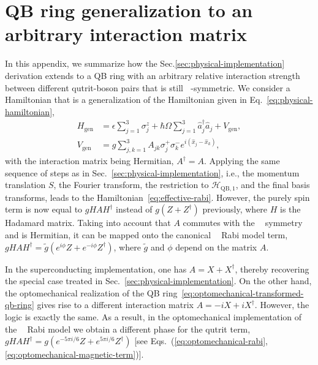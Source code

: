 \documentclass[reprint, aps, prx, amsmath, amssymb, longbibliography, superscriptaddress]{revtex4-2}
\DeclareMathOperator{\Zthree}{\mathbb{Z}_3}
\begin{document}
\appendix

\section{QB ring generalization to an arbitrary interaction matrix}
\label{app:arbitrary-interaction-summary}

In this appendix, we summarize how the Sec.\ref{sec:physical-implementation} derivation extends to a QB ring
with an arbitrary relative interaction strength between different qutrit-boson pairs that is still $\Zthree$-symmetric. We consider a Hamiltonian that is a generalization of the Hamiltonian given in Eq.~\eqref{eq:physical-hamiltonian},
\begin{equation}
\label{eq:arbitary-interaction-hamiltonian}
  \begin{aligned}
    H_{\text{gen}} &= \epsilon \sum_{j=1}^{3} \sigma_j^z
      + \hbar \Omega \sum_{j=1}^{3} \hat a_j^{\dagger} \hat a_j + V_{\text{gen}},
      \\
    V_{\text{gen}} &= g \sum_{j,k=1}^3 A_{jk}
      \sigma_j^{+} \sigma_k^{-} e^{ i ( \hat x_j - \hat x_k ) },
  \end{aligned}
\end{equation}
with the interaction matrix being Hermitian, $A^{\dagger}=A$. Applying the same sequence of steps as in Sec.~\ref{sec:physical-implementation}, i.e., the momentum translation $S$,
the Fourier transform, the restriction to $\mathcal H_{\text{QB},1}$, and the final basis transforms, leads to the Hamiltonian~\eqref{eq:effective-rabi}. However, the purely spin term is now equal to $gHAH^{\dagger}$ instead of $g(Z+Z^{\dagger})$ previously, where $H$ is the Hadamard matrix. Taking into account that $A$ commutes with the $\Zthree$ symmetry and is Hermitian, it can be mapped onto the
canonical $\Zthree$ Rabi model term, $g HAH^{\dagger}= \tilde g(e^{i\phi} Z + e^{-i\phi}Z^{\dagger})$, where $\tilde g$ and $\phi$ depend on the matrix $A$.  

In the superconducting implementation, one has $A = X + X^{\dagger}$, thereby
recovering the special case treated in Sec.~\ref{sec:physical-implementation}. On the other hand, the optomechanical realization of the QB ring~\eqref{eq:optomechanical-transformed-qb-ring}
gives rise to a different interaction matrix $A = -iX + iX^{\dagger}$. However, the logic is exactly the same. As a result, in the optomechanical implementation of the $\Zthree$ Rabi model we obtain a different phase for the qutrit term, $g HAH^{\dagger} = g(e^{-5\pi i/6} Z + e^{5\pi i/6} Z^{\dagger})$ [see Eqs.~(\ref{eq:optomechanical-rabi},\ref{eq:optomechanical-magnetic-term})].
\end{document}

